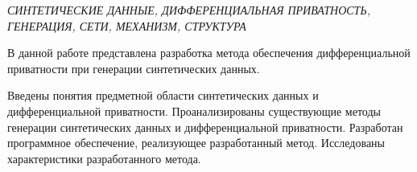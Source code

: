 \begin{essay}

\textit{СИНТЕТИЧЕСКИЕ ДАННЫЕ, ДИФФЕРЕНЦИАЛЬНАЯ ПРИВАТНОСТЬ, ГЕНЕРАЦИЯ, СЕТИ, МЕХАНИЗМ, СТРУКТУРА}

В данной работе представлена разработка метода обеспечения дифференциальной приватности при генерации синтетических данных.

Введены понятия предметной области синтетических данных и дифференциальной приватности. Проанализированы существующие методы генерации синтетических данных и дифференциальной приватности. Разработан программное обеспечение, реализующее разработанный метод. Исследованы характеристики разработанного метода.
\end{essay}

